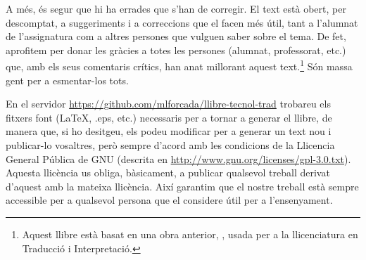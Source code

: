 A més, és segur que hi ha errades que s'han de corregir. El text està
obert, per descomptat, a suggeriments i a correccions que el facen més
útil, tant a l'alumnat de l'assignatura com a altres persones que
vulguen saber sobre el tema.  De fet, aprofitem per donar les gràcies
a totes les persones (alumnat, professorat, etc.) que, amb els seus
comentaris crítics, han anat millorant aquest text.\footnote{Aquest
  llibre està basat en una obra anterior, \protect\citep{forcada09b},
  usada per a la llicenciatura en Traducció i Interpretació.}  Són
massa gent per a esmentar-los tots.

En el servidor \url{https://github.com/mlforcada/llibre-tecnol-trad}
trobareu els fitxers font (\LaTeX, .eps, etc.) necessaris per a tornar
a generar el llibre, de manera que, si ho desitgeu, els podeu
modificar per a generar un text nou i publicar-lo vosaltres, però
sempre d'acord amb les condicions de la Llicencia General Pública de
GNU (descrita en
\url{http://www.gnu.org/licenses/gpl-3.0.txt}). Aquesta llicència us
obliga, bàsicament, a publicar qualsevol treball derivat d'aquest amb
la mateixa llicència. Així garantim que el nostre treball està sempre
accessible per a qualsevol persona que el considere útil per a
l'ensenyament.
